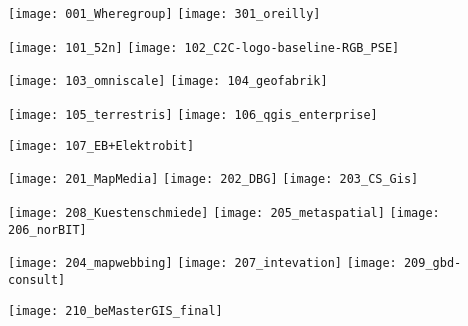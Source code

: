 \newpage\begin{center}
\texttt{[image: 001\_Wheregroup]}
\hfill
\texttt{[image: 301\_oreilly]}

\noindent\texttt{[image: 101\_52n]}
\hfill
\texttt{[image: 102\_C2C-logo-baseline-RGB\_PSE]}

\noindent\texttt{[image: 103\_omniscale]}
\hfill
\texttt{[image: 104\_geofabrik]}

\noindent\texttt{[image: 105\_terrestris]}
\hfill
\texttt{[image: 106\_qgis\_enterprise]}

\texttt{[image: 107\_EB+Elektrobit]}
\hfill

\noindent\texttt{[image: 201\_MapMedia]}
\hfill
\texttt{[image: 202\_DBG]}
\hfill
\texttt{[image: 203\_CS\_Gis]}

\noindent\texttt{[image: 208\_Kuestenschmiede]}
\hfill
\texttt{[image: 205\_metaspatial]}
\hfill
\texttt{[image: 206\_norBIT]}

\noindent\texttt{[image: 204\_mapwebbing]}
\hfill
\texttt{[image: 207\_intevation]}
\hfill
\texttt{[image: 209\_gbd-consult]}

\noindent\texttt{[image: 210\_beMasterGIS\_final]}






\end{center}